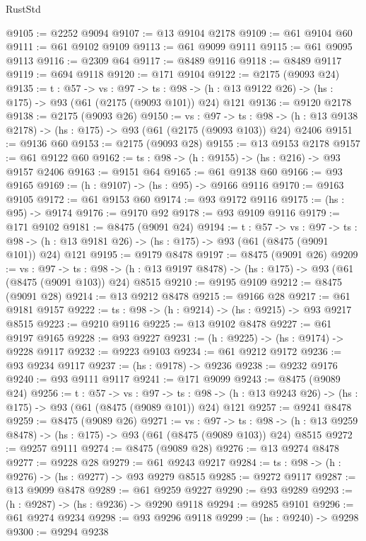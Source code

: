 \begin{lexlean}{RustStd}
\begin{coremodule}
@9105 := @2252 @9094
@9107 := @13 @9104 @2178
@9109 := @61 @9104 @60
@9111 := @61 @9102 @9109
@9113 := @61 @9099 @9111
@9115 := @61 @9095 @9113
@9116 := @2309 @64
@9117 := @8489 @9116
@9118 := @8489 @9117
@9119 := @694 @9118
@9120 := @171 @9104
@9122 := @2175 (@9093 @24)
@9135 := {t : @57} ->
  {vs : @97} ->
  {ts : @98} -> (h : @13 @9122 @26) -> (hs : @175) -> @93 (@61 (@2175 (@9093 @101)) @24) @121
@9136 := @9120 @2178
@9138 := @2175 (@9093 @26)
@9150 := {vs : @97} ->
  {ts : @98} -> (h : @13 @9138 @2178) -> (hs : @175) -> @93 (@61 (@2175 (@9093 @103)) @24) @2406
@9151 := @9136 @60
@9153 := @2175 (@9093 @28)
@9155 := @13 @9153 @2178
@9157 := @61 @9122 @60
@9162 := {ts : @98} -> (h : @9155) -> (hs : @216) -> @93 @9157 @2406
@9163 := @9151 @64
@9165 := @61 @9138 @60
@9166 := @93 @9165
@9169 := (h : @9107) -> (hs : @95) -> @9166 @9116
@9170 := @9163 @9105
@9172 := @61 @9153 @60
@9174 := @93 @9172 @9116
@9175 := (hs : @95) -> @9174
@9176 := @9170 @92
@9178 := @93 @9109 @9116
@9179 := @171 @9102
@9181 := @8475 (@9091 @24)
@9194 := {t : @57} ->
  {vs : @97} ->
  {ts : @98} -> (h : @13 @9181 @26) -> (hs : @175) -> @93 (@61 (@8475 (@9091 @101)) @24) @121
@9195 := @9179 @8478
@9197 := @8475 (@9091 @26)
@9209 := {vs : @97} ->
  {ts : @98} -> (h : @13 @9197 @8478) -> (hs : @175) -> @93 (@61 (@8475 (@9091 @103)) @24) @8515
@9210 := @9195 @9109
@9212 := @8475 (@9091 @28)
@9214 := @13 @9212 @8478
@9215 := @9166 @28
@9217 := @61 @9181 @9157
@9222 := {ts : @98} -> (h : @9214) -> (hs : @9215) -> @93 @9217 @8515
@9223 := @9210 @9116
@9225 := @13 @9102 @8478
@9227 := @61 @9197 @9165
@9228 := @93 @9227
@9231 := (h : @9225) -> (hs : @9174) -> @9228 @9117
@9232 := @9223 @9103
@9234 := @61 @9212 @9172
@9236 := @93 @9234 @9117
@9237 := (hs : @9178) -> @9236
@9238 := @9232 @9176
@9240 := @93 @9111 @9117
@9241 := @171 @9099
@9243 := @8475 (@9089 @24)
@9256 := {t : @57} ->
  {vs : @97} ->
  {ts : @98} -> (h : @13 @9243 @26) -> (hs : @175) -> @93 (@61 (@8475 (@9089 @101)) @24) @121
@9257 := @9241 @8478
@9259 := @8475 (@9089 @26)
@9271 := {vs : @97} ->
  {ts : @98} -> (h : @13 @9259 @8478) -> (hs : @175) -> @93 (@61 (@8475 (@9089 @103)) @24) @8515
@9272 := @9257 @9111
@9274 := @8475 (@9089 @28)
@9276 := @13 @9274 @8478
@9277 := @9228 @28
@9279 := @61 @9243 @9217
@9284 := {ts : @98} -> (h : @9276) -> (hs : @9277) -> @93 @9279 @8515
@9285 := @9272 @9117
@9287 := @13 @9099 @8478
@9289 := @61 @9259 @9227
@9290 := @93 @9289
@9293 := (h : @9287) -> (hs : @9236) -> @9290 @9118
@9294 := @9285 @9101
@9296 := @61 @9274 @9234
@9298 := @93 @9296 @9118
@9299 := (hs : @9240) -> @9298
@9300 := @9294 @9238

\end{coremodule}
\end{lexlean}

